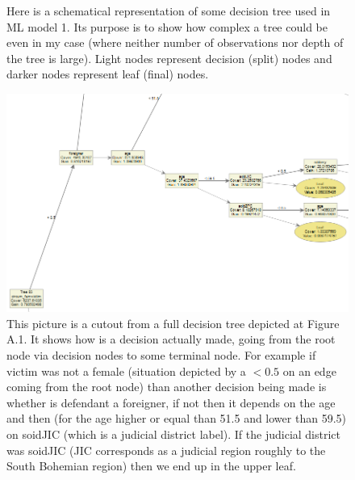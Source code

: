 \documentclass[12pt, twoside,openany]{book} %
\begin{document}
\begin{appendices}
\begin{figure}[ht]
{Here is a schematical representation of some decision tree used in ML model 1. Its purpose is to show how complex a tree could be even in my case (where neither number of observations nor depth of the tree is large). Light nodes represent decision (split) nodes and darker nodes represent leaf (final) nodes. 
}
\end{figure}

\begin{figure}[ht]
\small{

\includegraphics[width=\textwidth, height=\dimexpr
  \textheight-4\baselineskip-\parskip-.2em-
  \abovecaptionskip-\belowcaptionskip\relax]{ml1_dtree_part_renamed.png}
This picture is a cutout from a full decision tree depicted at Figure A.1. It shows how is a decision actually made, going from the root node via decision nodes to some terminal node. For example if victim was not a female (situation depicted by a $< 0.5$ on an edge coming from the root node) than another decision being made is whether is defendant a foreigner, if not then it depends on the age and then (for the age higher or equal than 51.5 and lower than 59.5) on soidJIC (which is a judicial district label). If the judicial district was soidJIC (JIC corresponds as a judicial region roughly to the South Bohemian region) then we end up in the upper leaf.
}
\end{figure}




\end{appendices}
\end{document}

